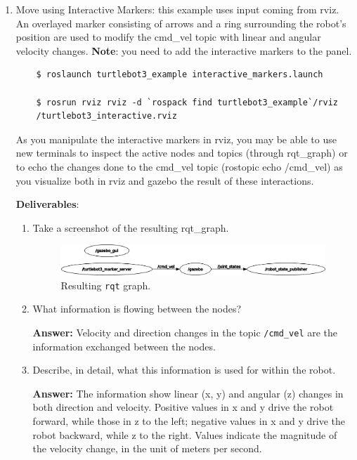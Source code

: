 \documentclass[12pt]{article}
\begin{document}
\begin{enumerate}
  \item Move using Interactive Markers: this example uses input coming from rviz. An overlayed marker consisting of arrows and a ring surrounding the robot’s position are used to modify the cmd\_vel topic with linear and angular velocity changes. \textbf{Note}: you need to add the interactive markers to the panel.

  \begin{verbatim}
    $ roslaunch turtlebot3_example interactive_markers.launch

    $ rosrun rviz rviz -d `rospack find turtlebot3_example`/rviz
    /turtlebot3_interactive.rviz
  \end{verbatim}

  As you manipulate the interactive markers in rviz, you may be able to use new terminals to inspect the active nodes and topics (through rqt\_graph) or to echo the changes done to the cmd\_vel topic (rostopic echo /cmd\_vel) as you visualize both in rviz and gazebo the result of these interactions.

  \textbf{Deliverables}: 

    \begin{enumerate}

      \item Take a screenshot of the resulting rqt\_graph.
    
      \begin{figure}[H]
        \centering\includegraphics[width=14cm]{lab1figure/rosgraph.png}\vspace{-10pt}
        \caption{Resulting \texttt{rqt} graph.}\label{fig:rosgraph}
        \end{figure}

      \item What information is flowing between the nodes?

      \textbf{Answer: }Velocity and direction changes in the topic \texttt{/cmd_vel} are the information exchanged between the nodes.

      \item Describe, in detail, what this information is used for within the robot.
    
      \textbf{Answer: }The information show linear (x, y) and angular (z) changes in both direction and velocity. 
      Positive values in x and y drive the robot forward, while those in z to the left; negative values in x and y drive the robot backward, while z to the right.
      Values indicate the magnitude of the velocity change, in the unit of meters per second.
    

\end{enumerate}
\end{enumerate}
\end{document}
